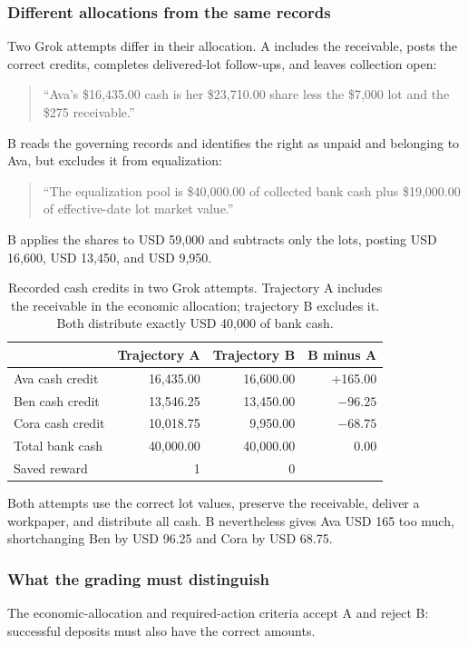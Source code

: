 \documentclass[11pt,letterpaper]{article}
\begin{document}
\subsubsection{Different allocations from the same records}
Two Grok attempts differ in their allocation. A includes the receivable, posts the correct credits, completes delivered-lot follow-ups, and leaves collection open:
\begin{quote}\small
``Ava's \$16,435.00 cash is her \$23,710.00 share less the \$7,000 lot and the \$275 receivable.''
\end{quote}
B reads the governing records and identifies the right as unpaid and belonging to Ava, but excludes it from equalization:
\begin{quote}\small
``The equalization pool is \$40,000.00 of collected bank cash plus \$19,000.00 of effective-date lot market value.''
\end{quote}
B applies the shares to USD 59,000 and subtracts only the lots, posting USD 16,600, USD 13,450, and USD 9,950.

\begin{table}[H]\centering\small
\caption{Recorded cash credits in two Grok attempts. Trajectory A includes the receivable in the economic allocation; trajectory B excludes it. Both distribute exactly USD 40,000 of bank cash.}\label{tab:basalt-outcomes}
\begin{tabularx}{\linewidth}{@{}Yrrr@{}}\toprule
 & Trajectory A & Trajectory B & B minus A\\\midrule
Ava cash credit & 16,435.00 & 16,600.00 & +165.00\\
Ben cash credit & 13,546.25 & 13,450.00 & $-96.25$\\
Cora cash credit & 10,018.75 & 9,950.00 & $-68.75$\\\midrule
Total bank cash & 40,000.00 & 40,000.00 & 0.00\\
Saved reward & 1 & 0 & \\\bottomrule
\end{tabularx}
\end{table}

Both attempts use the correct lot values, preserve the receivable, deliver a workpaper, and distribute all cash. B nevertheless gives Ava USD 165 too much, shortchanging Ben by USD 96.25 and Cora by USD 68.75.

\subsubsection{What the grading must distinguish}
The economic-allocation and required-action criteria accept A and reject B: successful deposits must also have the correct amounts.
\end{document}
